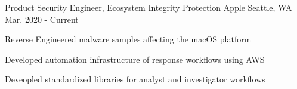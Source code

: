 


\begin{cventries}




\cventry
{Product Security Engineer, Ecosystem Integrity Protection} %
{Apple} %
{Seattle, WA} %
{Mar. 2020 - Current} %
{ %
\begin{cvitems}
\item {Reverse Engineered malware samples affecting the macOS platform}
\item {Developed automation infrastructure of response workflows using AWS}
\item {Deveopled standardized libraries for analyst and investigator workflows}
\end{cvitems}
}



\end{cventries}
